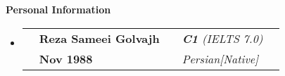 \documentclass[letterpaper,12pt]{article}[leftmargin=*]
\makeatletter
\def \entryspacing {-0pt}
\renewcommand{\section}[2]{\vspace{5pt}
  \colorbox{secondary}{\color{white}\raggedbottom\normalsize\textbf{{#1}{\hspace{7pt}#2}}}
}
\newcommand{\resumeEntryStart}{\begin{itemize}[leftmargin=2.5mm]}
\newcommand{\resumeEntryEnd}{\end{itemize}\vspace{\entryspacing}}
\newcommand{\aboutMeEntryTSDL}[4]{
  \vspace{-1pt}\item[]
    \begin{tabular*}{0.97\textwidth}{l@{\extracolsep{\fill}}lrlr}
	  \color{primary}{Full name} & \textbf{\color{accent}#1} &
	  \color{primary}{English Fluency} & \textit{\color{accent}#3} \\
	  \color{primary}{Date of Birth} & \textbf{\color{accent}#2} &
	  \color{primary}{Other Languages} & \textit{\color{accent}#4} \\
    \end{tabular*}\vspace{-6pt}
}
\newcommand{\resumeEntryS}[2]{
  \item[]\small{
    \textbf{\color{primary}#1 }{ #2 \vspace{-6pt}}
  }
}
\makeatother
\begin{document}
	

\section{\faUser}{Personal Information}
    \resumeEntryStart
      \aboutMeEntryTSDL
	  	{Reza Sameei Golvajh}{Nov 1988}{\textbf{C1} (IELTS 7.0)}{Persian[Native]}
    \resumeEntryEnd
  
\end{document}
